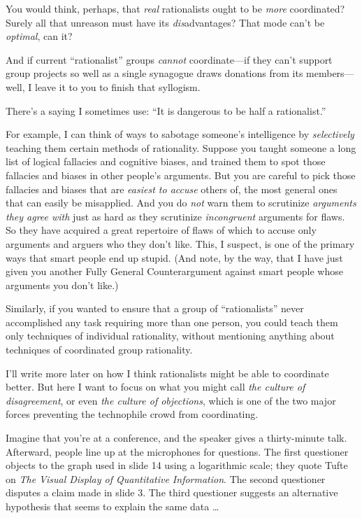 {
 You would think, perhaps, that \textit{real} rationalists ought to
be \textit{more} coordinated? Surely all that unreason must have its
\textit{dis}advantages? That mode can't be
\textit{optimal}, can it?}

{
 And if current ``rationalist''
groups \textit{cannot} coordinate---if they can't
support group projects so well as a single synagogue draws donations
from its members---well, I leave it to you to finish that syllogism.}

{
 There's a saying I sometimes use:
``It is dangerous to be half a
rationalist.''}

{
 For example, I can think of ways to sabotage
someone's intelligence by \textit{selectively} teaching
them certain methods of rationality. Suppose you taught someone a long
list of logical fallacies and cognitive biases, and trained them to
spot those fallacies and biases in other people's
arguments. But you are careful to pick those fallacies and biases that
are \textit{easiest to accuse} others of, the most general ones that
can easily be misapplied. And you do \textit{not} warn them to
scrutinize \textit{arguments they agree with} just as hard as they
scrutinize \textit{incongruent} arguments for flaws. So they have
acquired a great repertoire of flaws of which to accuse only arguments
and arguers who they don't like. This, I suspect, is
one of the primary ways that smart people end up stupid. (And note, by
the way, that I have just given you another Fully General
Counterargument against smart people whose arguments you
don't like.)}

{
 Similarly, if you wanted to ensure that a group of
``rationalists'' never accomplished
any task requiring more than one person, you could teach them only
techniques of individual rationality, without mentioning anything about
techniques of coordinated group rationality.}

{
 I'll write more later on how I think rationalists
might be able to coordinate better. But here I want to focus on what
you might call \textit{the culture of disagreement}, or even
\textit{the culture of objections}, which is one of the two major
forces preventing the technophile crowd from coordinating.}

{
 Imagine that you're at a conference, and the
speaker gives a thirty-minute talk. Afterward, people line up at the
microphones for questions. The first questioner objects to the graph
used in slide 14 using a logarithmic scale; they quote Tufte on
\textit{The Visual Display of Quantitative Information}. The second
questioner disputes a claim made in slide 3. The third questioner
suggests an alternative hypothesis that seems to explain the same data
\ldots}

